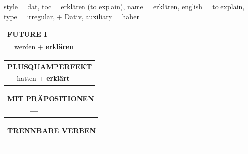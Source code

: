 \begin{verbentry}{
  style = {dat},
  toc = {erklären (to explain)},
  name = {erklären},
  english = {to explain},
  type = {irregular, + Dativ},
  auxiliary = {haben}
}
\begin{tabular}{rl}
    \multicolumn{2}{l}{\textbf{FUTURE I} }\\
  &  werden + \textbf{erklären}\\
 
  \end{tabular}
\hfill
   \begin{tabular}{rl}
      \multicolumn{2}{l}{\textbf{PLUSQUAMPERFEKT}}\\
  &  hatten + \textbf{erklärt}\\
  \end{tabular}
  
  
\vspace{10pt}

\begin{tabular}{lll}
\multicolumn{3}{l}{\textbf{MIT PRÄPOSITIONEN}}\\
& \textbf{---} & \\
\end{tabular}
\hfill
\begin{tabular}{lll}
\multicolumn{3}{l}{\textbf{TRENNBARE VERBEN}}\\
& \textbf{---} & \\
\end{tabular}
\vspace{-5pt}
\end{verbentry}

